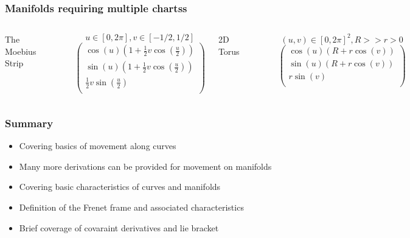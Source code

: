\documentclass[10pt]{beamer}
\begin{document}
\begin{frame}
  \frametitle{Manifolds requiring multiple chartss}
  \begin{columns}
    \column{6cm}
    \centerline{\Large The Moebius Strip}\\
    \centerline{\includegraphics[width=4cm]{moebius-strip}}
    \begin{center}
      \[ u \in [0, 2 \pi], v \in [-1/2, 1/2] \]
      \[
        \left(
          \begin{array}{c}
            \cos(u) \left( 1+\frac{1}{2} v \cos \left(\frac{u}{2}\right)\right)\\
            \sin(u) \left( 1+\frac{1}{2} v \cos \left(\frac{u}{2}\right)\right)\\
            \frac{1}{2} v \sin \left(\frac{u}{2} \right)\\ 
          \end{array}
        \right)
      \]
    \end{center}
    \column{6cm}
    \centerline{\Large 2D Torus}\\
    \centerline{\includegraphics[width=4cm]{torus}}
    \begin{center}
      \[ (u,v) \in [0,2 \pi]^2, R>> r > 0 \]
      \[ 
        \left(
          \begin{array}{c}
            \cos(u) \left( R + r \cos(v) \right)\\
            \sin(u) \left( R + r \cos(v) \right)\\
            r \sin(v)\\
          \end{array}
        \right)
      \]
    \end{center}
  \end{columns}
 \end{frame}

\begin{frame}
  \frametitle{Summary}
  \begin{itemize}
  \item Covering basics of movement along curves
  \item Many more derivations can be provided for movement on manifolds
  \item Covering basic characteristics of curves and manifolds
  \item Definition of the Frenet frame and associated characteristics
  \item Brief coverage of covaraint derivatives and lie bracket
  \end{itemize}
\end{frame}
\end{document}

